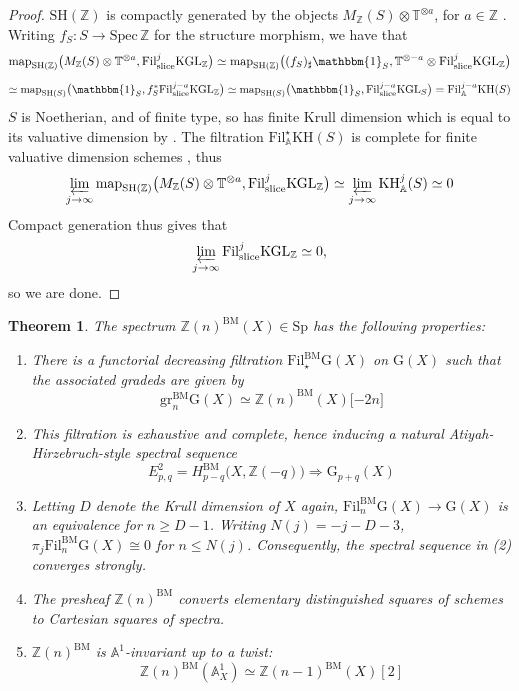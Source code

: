 \documentclass[11pt, twoside]{article}
\numberwithin{equation}{section}
\newtheorem{theorem}[equation]{Theorem}
\theoremstyle{definition}
\newcommand{\bb}[1]{\mathbb{#1}}
\newcommand{\spec}{\mathrm{Spec} \,}
\newcommand{\catlim}{\varprojlim}
\newcommand{\map}{\mathrm{map}}
\newcommand{\fil}{\mathrm{Fil}}
\newcommand{\gr}{\mathrm{gr}}
\newcommand{\Kgl}{\mathrm{KGL}}
\newcommand{\sh}{\mathrm{SH}}
\newcommand{\Sp}{\mathrm{Sp}}
\newcommand{\bm}{\mathrm{BM}}
\newcommand{\G}{\mathrm{G}}
\newcommand{\sli}{\mathrm{slice}}
\newcommand{\KH}{\mathrm{KH}}
\begin{document}
\begin{proof}
\(\sh(\bb{Z})\) is compactly generated by the objects \(M_\bb{Z}(S) \otimes \bb{T}^{\otimes a}\), for \(a \in \bb{Z}\) \cite[Proposition C.12 (1)]{Hoy}. Writing \(f_S \colon S \to \spec \bb{Z}\) for the structure morphism, we have that 
\[\map_{\sh(\bb{Z})}\big(M_\bb{Z}(S) \otimes \bb{T}^{\otimes a}, \fil_\sli^j\Kgl_\bb{Z}\big) \simeq \map_{\sh(\bb{Z})}\big((f_S)_\sharp \mathbbm{1}_S, \bb{T}^{\otimes - a} \otimes \fil_\sli^j\Kgl_\bb{Z}\big)\]
\[\simeq \map_{\sh(S)}\big(\mathbbm{1}_S, f_S^*\fil_\sli^{j - a} \Kgl_\bb{Z}\big) \simeq \map_{\sh(S)}\big(\mathbbm{1}_S, \fil_\sli^{j - a} \Kgl_S\big) = \fil_\bb{A}^{j - a} \KH(S) \]
\(S\) is Noetherian, and of finite type, so has finite Krull dimension which is equal to its valuative dimension by \cite[Proposition 2.3.2 (9)]{EHMK}. The filtration \(\fil_\bb{A}^\star \KH(S)\) is complete for finite valuative dimension schemes \cite[Corollary 9.5]{BEM}, thus 
\[\catlim_{j \to \infty} \map_{\sh(\bb{Z})}\big(M_\bb{Z}(S) \otimes \bb{T}^{\otimes a}, \fil_\sli^j \Kgl_\bb{Z}\big) \simeq \catlim_{j \to \infty} \KH_\bb{A}^j(S) \simeq 0\]
Compact generation thus gives that 
\[\catlim_{j \to \infty} \fil_\sli^j \Kgl_\bb{Z} \simeq 0,\]
so we are done.
\end{proof}

\begin{theorem}
The spectrum \(\bb{Z}(n)^\bm(X) \in \Sp\) has the following properties: 
\begin{enumerate}

\item There is a functorial decreasing filtration \(\fil_\star^\bm \G(X)\) on \(\G(X)\) such that the associated gradeds are given by 
\[\gr_n^\bm \G(X) \simeq \bb{Z}(n)^\bm(X)\lbrack -2n \rbrack\]

\item This filtration is exhaustive and complete, hence inducing a natural Atiyah-Hirzebruch-style spectral sequence 
\[E_{p, q}^2 = H_{p - q}^\bm\big(X, \bb{Z}(- q)\big) \Longrightarrow \G_{p + q}(X)\]

\item Letting \(D\) denote the Krull dimension of \(X\) again, \(\fil_n^\bm \G(X) \to \G(X)\) is an equivalence for \(n \geq D - 1\). Writing \(N(j) = - j - D - 3\), \(\pi_j \fil_n^\bm \G(X) \cong 0\) for \(n \leq N(j)\). Consequently, the spectral sequence in (2) converges strongly.

\item The presheaf \(\bb{Z}(n)^\bm\) converts elementary distinguished squares of schemes to Cartesian squares of spectra.

\item \(\bb{Z}(n)^\bm\) is \(\bb{A}^1\)-invariant up to a twist: 
\[\bb{Z}(n)^\bm(\bb{A}_X^1) \simeq \bb{Z}(n - 1)^\bm(X)[2]\]

\end{enumerate}
\end{theorem}
\end{document}
